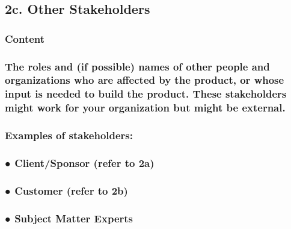 \documentclass[
]{article}
\begin{document}
\hypertarget{c.-other-stakeholders}{%
\subsection{2c. Other Stakeholders}\label{c.-other-stakeholders}}

\hypertarget{content-4}{%
\subsubsection{Content}\label{content-4}}

\hypertarget{the-roles-and-if-possible-names-of-other-people-and-organizations-who-are-affected-by-the-product-or-whose-input-is-needed-to-build-the-product.-these-stakeholders-might-work-for-your-organization-but-might-be-external.}{%
\subsubsection{The roles and (if possible) names of other people and
organizations who are affected by the product, or whose input is needed
to build the product. These stakeholders might work for your
organization but might be
external.}\label{the-roles-and-if-possible-names-of-other-people-and-organizations-who-are-affected-by-the-product-or-whose-input-is-needed-to-build-the-product.-these-stakeholders-might-work-for-your-organization-but-might-be-external.}}

\hypertarget{examples-of-stakeholders}{%
\subsubsection{Examples of
stakeholders:}\label{examples-of-stakeholders}}

\hypertarget{clientsponsor-refer-to-2a}{%
\subsubsection{● Client/Sponsor (refer to
2a)}\label{clientsponsor-refer-to-2a}}

\hypertarget{customer-refer-to-2b}{%
\subsubsection{● Customer (refer to 2b)}\label{customer-refer-to-2b}}

\hypertarget{subject-matter-experts}{%
\subsubsection{● Subject Matter Experts}\label{subject-matter-experts}}
\end{document}
